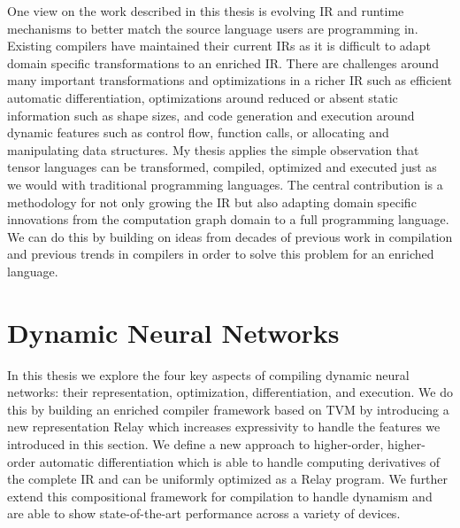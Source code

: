 One view on the work described in this thesis is evolving IR and runtime mechanisms to better
  match the source language users are programming in.
Existing compilers have maintained their current IRs as it is difficult
  to adapt domain specific transformations to an enriched IR.
There are challenges around many important transformations and optimizations
  in a richer IR such as efficient automatic differentiation, optimizations around
  reduced or absent static information such as shape sizes, and code generation
  and execution around dynamic features such as control flow, function calls,
  or allocating and manipulating data structures.
My thesis applies the simple observation that tensor languages can be transformed, compiled,
  optimized and executed just as we would with traditional programming languages.
The central contribution is a methodology for not only growing the IR but also
  adapting domain specific innovations from the computation graph domain to
  a full programming language.
We can do this by building on ideas from decades of previous work in compilation and previous
    trends in compilers in order to solve this problem for an enriched language.

\section{Dynamic Neural Networks}

In this thesis we explore the four key aspects of compiling dynamic
  neural networks: their representation, optimization, differentiation,
  and execution.
We do this by building an enriched compiler framework based on TVM by introducing
  a new representation Relay which increases expressivity to handle the features
  we introduced in this section.
We define a new approach to higher-order, higher-order automatic differentiation
  which is able to handle computing derivatives of the complete IR and
  can be uniformly optimized as a Relay program.
We further extend this compositional framework for compilation to handle dynamism
  and are able to show state-of-the-art performance across a variety of devices.

